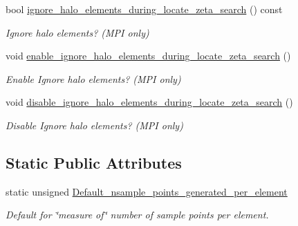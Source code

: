 \begin{DoxyCompactItemize}
bool \hyperlink{classoomph_1_1SamplePointContainerParameters_a436175c53c2801c510673146cdb75761}{ignore\+\_\+halo\+\_\+elements\+\_\+during\+\_\+locate\+\_\+zeta\+\_\+search} () const
\begin{DoxyCompactList}\small\item\em Ignore halo elements? (M\+PI only) \end{DoxyCompactList}\item 
void \hyperlink{classoomph_1_1SamplePointContainerParameters_a6585db241b22e087222ca3b09e99b663}{enable\+\_\+ignore\+\_\+halo\+\_\+elements\+\_\+during\+\_\+locate\+\_\+zeta\+\_\+search} ()
\begin{DoxyCompactList}\small\item\em Enable Ignore halo elements? (M\+PI only) \end{DoxyCompactList}\item 
void \hyperlink{classoomph_1_1SamplePointContainerParameters_ae1520f275ffb0941541aa51c89f3eeec}{disable\+\_\+ignore\+\_\+halo\+\_\+elements\+\_\+during\+\_\+locate\+\_\+zeta\+\_\+search} ()
\begin{DoxyCompactList}\small\item\em Disable Ignore halo elements? (M\+PI only) \end{DoxyCompactList}\end{DoxyCompactItemize}
\subsection*{Static Public Attributes}
\begin{DoxyCompactItemize}
\item 
static unsigned \hyperlink{classoomph_1_1SamplePointContainerParameters_ad8a463ddc961e51f6f77b4e8f678b962}{Default\+\_\+nsample\+\_\+points\+\_\+generated\+\_\+per\+\_\+element}
\begin{DoxyCompactList}\small\item\em Default for \char`\"{}measure of\char`\"{} number of sample points per element. \end{DoxyCompactList}\end{DoxyCompactItemize}
